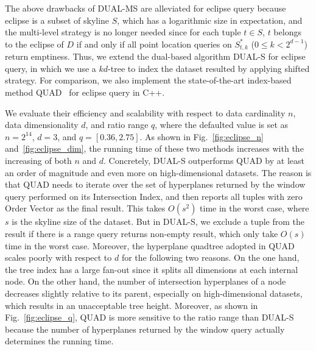 The above drawbacks of \textsc{DUAL-MS} are alleviated for eclipse query because eclipse is a subset of skyline $S$, which has a logarithmic size in expectation, and the multi-level strategy is no longer needed since for each tuple $t \in S$, $t$ belongs to the eclipse of $D$ if and only if all point location queries on $S^*_{t, k}$ ($0 \le k < 2^{d-1}$) return emptiness.
Thus, we extend the dual-based algorithm \textsc{DUAL-S} for eclipse query, in which we use a $kd$-tree to index the dataset resulted by applying shifted strategy.
For comparison, we also implement the state-of-the-art index-based method \textsc{QUAD}~\cite{DBLP:conf/icde/Liu0ZP021} for eclipse query in C++.

We evaluate their efficiency and scalability with respect to data cardinality $n$, data dimensionality $d$, and ratio range $q$, where the defaulted value is set as $n = 2^{14}$, $d = 3$, and $q = [0.36, 2.75]$.
As shown in Fig.~\ref{fig:eclipse_n} and~\ref{fig:eclipse_dim}, the running time of these two methods increases with the increasing of both $n$ and $d$.
Concretely, \textsc{DUAL-S} outperforms \textsc{QUAD} by at least an order of magnitude and even more on high-dimensional datasets.
The reason is that \textsc{QUAD} needs to iterate over the set of hyperplanes returned by the window query performed on its Intersection Index, and then reports all tuples with zero Order Vector as the final result.
This takes $O(s^2)$ time in the worst case, where $s$ is the skyline size of the dataset.
But in \textsc{DUAL-S}, we exclude a tuple from the result if there is a range query returns non-empty result, which only take $O(s)$ time in the worst case.
Moreover, the hyperplane quadtree adopted in \textsc{QUAD} scales poorly with respect to $d$ for the following two reasons.
On the one hand, the tree index has a large fan-out since it splits all dimensions at each internal node.
On the other hand, the number of intersection hyperplanes of a node decreases slightly relative to its parent, especially on high-dimensional datasets, which results in an unacceptable tree height.
Moreover, as shown in Fig.~\ref{fig:eclipse_q}, \textsc{QUAD} is more sensitive to the ratio range than \textsc{DUAL-S} because the number of hyperplanes returned by the window query actually determines the running time.


